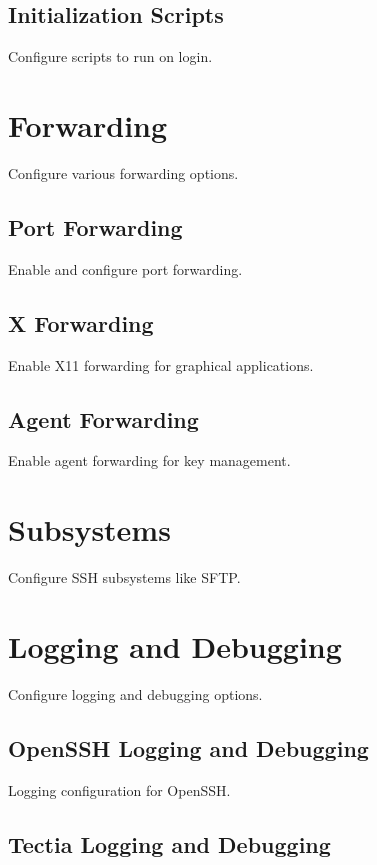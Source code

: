 \documentclass[12pt]{book}
\begin{document}
\subsection{Initialization Scripts}

Configure scripts to run on login.

\section{Forwarding}

Configure various forwarding options.

\subsection{Port Forwarding}

Enable and configure port forwarding.

\subsection{X Forwarding}

Enable X11 forwarding for graphical applications.

\subsection{Agent Forwarding}

Enable agent forwarding for key management.

\section{Subsystems}

Configure SSH subsystems like SFTP.

\section{Logging and Debugging}

Configure logging and debugging options.

\subsection{OpenSSH Logging and Debugging}

Logging configuration for OpenSSH.

\subsection{Tectia Logging and Debugging}
\end{document}

